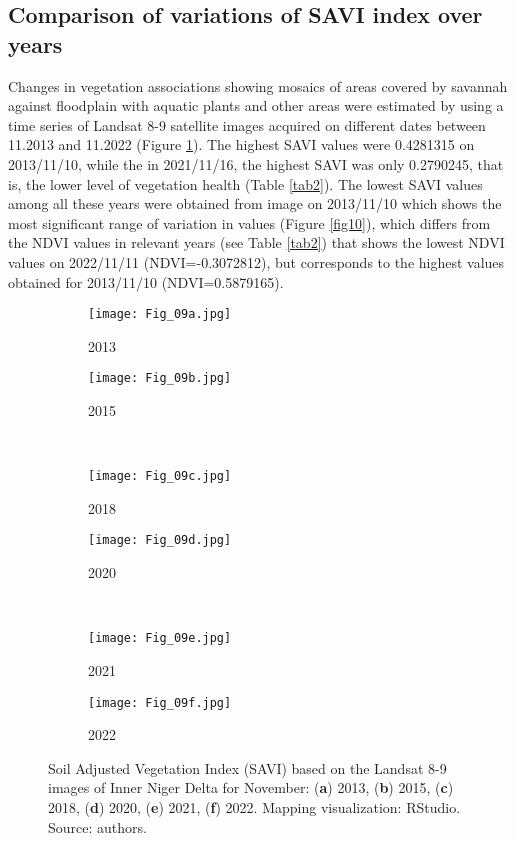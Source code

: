 \documentclass[12pt,a4paper,oneside]{article}
\def \newpar{\vspace{6pt}}
\begin{document}
\subsection*{Comparison of variations of SAVI index over years}

\newpar Changes in vegetation associations showing mosaics of areas covered by savannah against floodplain with aquatic plants and other areas were estimated by using a time series of Landsat 8-9 satellite images acquired on different dates between 11.2013 and 11.2022 (Figure \ref{fig09}). The highest SAVI values were 0.4281315 on 2013/11/10, while the in 2021/11/16, the highest SAVI was only 0.2790245, that is, the lower level of vegetation health (Table \ref{tab2}). The lowest SAVI values among all these years were obtained from image on 2013/11/10 which shows the most significant range of variation in values (Figure \ref{fig10}), which differs from the NDVI values in relevant years (see Table \ref{tab2}) that shows the lowest NDVI values on 2022/11/11 (NDVI=-0.3072812), but corresponds to the highest values obtained for 2013/11/10 (NDVI=0.5879165).  

\begin{figure}[H]
	\begin{subfigure}[b]{.5\textwidth}
		\centering
			\texttt{[image: Fig\_09a.jpg]}
		\caption{2013}
	\end{subfigure}%
	\begin{subfigure}[b]{.5\textwidth}
		\centering
		\texttt{[image: Fig\_09b.jpg]}
		\caption{2015}
	\end{subfigure}%
\\
\vfill \vspace{1mm}
	\begin{subfigure}[b]{.5\textwidth}
		\centering
			\texttt{[image: Fig\_09c.jpg]}
		\caption{2018}
	\end{subfigure}%
	\begin{subfigure}[b]{.5\textwidth}
		\centering
		\texttt{[image: Fig\_09d.jpg]}
		\caption{2020}
	\end{subfigure}%
\\
\vfill \vspace{1mm}
	\begin{subfigure}[b]{.5\textwidth}
		\centering
			\texttt{[image: Fig\_09e.jpg]}
		\caption{2021}
	\end{subfigure}%
	\begin{subfigure}[b]{.5\textwidth}
		\centering
		\texttt{[image: Fig\_09f.jpg]}
		\caption{2022}
	\end{subfigure}%
\vspace*{20pt}\caption{Soil Adjusted Vegetation Index (SAVI) based on the Landsat 8-9 images of Inner Niger Delta for November: (\textbf{a}) 2013, (\textbf{b}) 2015, (\textbf{c}) 2018, (\textbf{d}) 2020, (\textbf{e}) 2021, (\textbf{f}) 2022. Mapping visualization: RStudio. Source: authors.}\label{fig09}
\end{figure}
\end{document}
